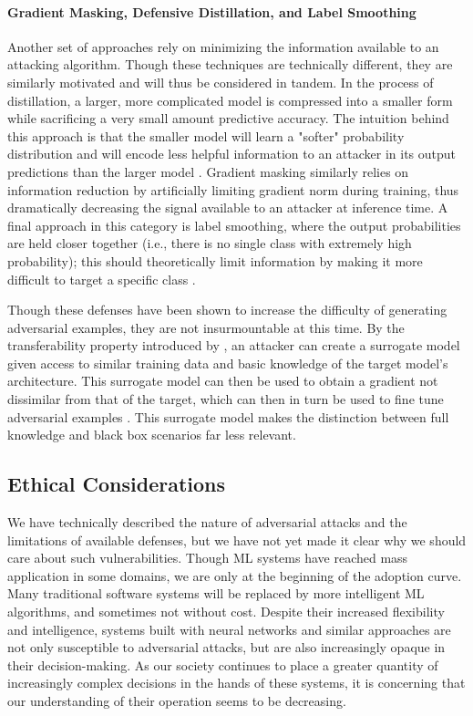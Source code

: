 \documentclass[]{article}
\begin{document}
\paragraph{Gradient Masking, Defensive Distillation, and Label Smoothing} Another set of approaches rely on minimizing the information available to an attacking algorithm. Though these techniques are technically different, they are similarly motivated and will thus be considered in tandem. In the process of distillation, a larger, more complicated model is compressed into a smaller form while sacrificing a very small amount predictive accuracy. The intuition behind this approach is that the smaller model will learn a "softer" probability distribution and will encode less helpful information to an attacker in its output predictions than the larger model \citep{DBLP:journals/corr/PapernotMWJS15}. Gradient masking similarly relies on information reduction by artificially limiting gradient norm during training, thus dramatically decreasing the signal available to an attacker at inference time. A final approach in this category is label smoothing, where the output probabilities are held closer together (i.e., there is no single class with extremely high probability); this should theoretically limit information by making it more difficult to target a specific class \citep{DBLP:journals/corr/PapernotMSW16}.

Though these defenses have been shown to increase the difficulty of generating adversarial examples, they are not insurmountable at this time. By the transferability property introduced by \citet{DBLP:journals/corr/PapernotMG16}, an attacker can create a surrogate model given access to similar training data and basic knowledge of the target model's architecture. This surrogate model can then be used to obtain a gradient not dissimilar from that of the target, which can then in turn be used to fine tune adversarial examples \citep{DBLP:journals/corr/PapernotMSW16}. This surrogate model makes the distinction between full knowledge and black box scenarios far less relevant.

\subsection{Ethical Considerations}

We have technically described the nature of adversarial attacks and the limitations of available defenses, but we have not yet made it clear why we should care about such vulnerabilities. Though ML systems have reached mass application in some domains, we are only at the beginning of the adoption curve. Many traditional software systems will be replaced by more intelligent ML algorithms, and sometimes not without cost. Despite their increased flexibility and intelligence, systems built with neural networks and similar approaches are not only susceptible to adversarial attacks, but are also increasingly opaque in their decision-making. As our society continues to place a greater quantity of increasingly complex decisions in the hands of these systems, it is concerning that our understanding of their operation seems to be decreasing.
\end{document}
